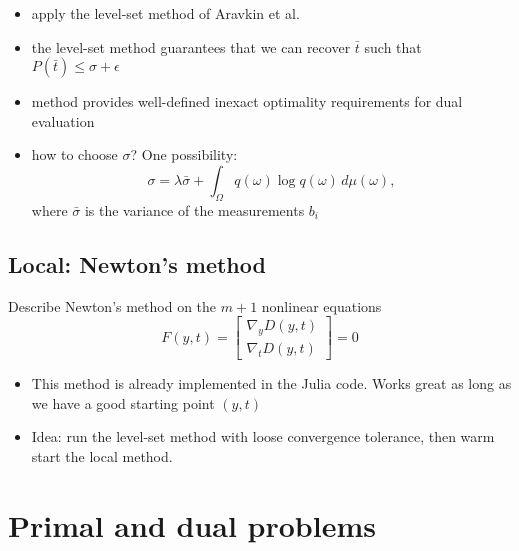 \documentclass[10pt,a4paper]{article}
\numberwithin{equation}{section}
\theoremstyle{definition}
\begin{document}
\begin{itemize}
    \item apply the level-set method of Aravkin et al.~\cite{aravkinLevelsetMethodsConvex2019}
    \item the level-set method guarantees that we can recover $\bar t$ such that $P(\bar t)\le\sigma + \epsilon$
    \item method provides well-defined inexact optimality requirements for dual evaluation
    \item how to choose $\sigma$? One possibility: $$\sigma = \lambda\bar\sigma + \int_\Omega q(\omega)\log q(\omega)\,d\mu(\omega),$$
    where $\bar\sigma$ is the variance of the measurements $b_i$
\end{itemize}

\subsection{Local: Newton's method}

Describe Newton's method on the $m+1$ nonlinear equations
$$
F(y,t) = \begin{bmatrix}
    \nabla_y D(y,t)\\
    \nabla_t D(y,t)
\end{bmatrix} = 0
$$

\begin{itemize}
    \item This method is already implemented in the Julia code. Works great as long as we have a good starting point $(y,t)$
    \item Idea: run the level-set method with loose convergence tolerance, then warm start the local method.
\end{itemize}


\section{Primal and dual problems}
\end{document}
